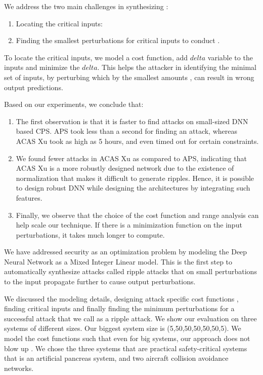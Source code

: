 We address the two main challenges in synthesizing \attack: 
\begin{enumerate}
	\item Locating the critical inputs: 
	
	\item Finding the smallest perturbations for critical inputs to conduct \attack.
	
\end{enumerate}
To locate the critical inputs, we model a cost function,  add $delta$ variable to the inputs and minimize the $delta$. 
This helps the attacker in identifying the minimal set of inputs, by perturbing which by the smallest amounts , can result in wrong output predictions. 

Based on our experiments, we conclude that:

\begin{enumerate}
	\item The first observation is that it is faster to find attacks on small-sized DNN based CPS. 
	APS took less than a second for finding an attack, whereas ACAS Xu took as high as 5 hours, and even timed out for certain constraints. 
	
	\item We found fewer attacks in ACAS Xu as compared to APS, indicating  that ACAS Xu is a more robustly designed network due to the existence of normalization that makes it difficult to generate ripples. 
	Hence, it is possible to design robust \ac{DNN} while designing the architectures by integrating such features. 
	
	\item Finally, we observe that the choice of the cost function and range analysis can help scale our technique. 
	If there is a minimization function on the input perturbations, it takes much longer to compute.
\end{enumerate}




\iffalse
We have addressed security as an optimization problem by modeling the Deep Neural Network as a Mixed Integer Linear model. This is the first step to automatically synthesize attacks called ripple attacks that on small perturbations to the input propagate further to cause output perturbations. 

We discussed the modeling details, designing attack specific cost functions , finding critical inputs and finally finding the minimum perturbations for a successful attack that we call as a ripple attack. We show our evaluation on three systems of different sizes. Our biggest system size is (5,50,50,50,50,50,5). We model the cost functions such that even for big systems, our approach does not blow up . We chose the three systems that are practical safety-critical systems that is an artificial pancreas system, and two aircraft collision avoidance networks.

